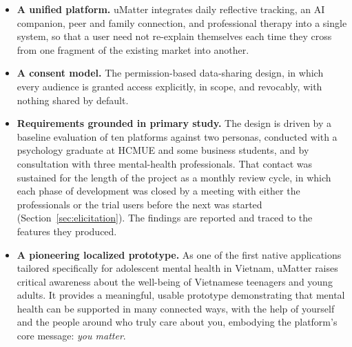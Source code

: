 \begin{itemize}
  \item \textbf{A unified platform.} uMatter integrates daily reflective
    tracking, an AI companion, peer and family connection, and professional
    therapy into a single system, so that a user need not re-explain themselves
    each time they cross from one fragment of the existing market into another.

  \item \textbf{A consent model.} The permission-based data-sharing design, in which every
    audience is granted access explicitly, in scope, and revocably, with nothing
    shared by default.


  \item \textbf{Requirements grounded in primary study.} The design is
    driven by a baseline evaluation of ten platforms against two
    personas, conducted with a psychology graduate at HCMUE and some business students, and by consultation
    with three mental-health professionals. That contact was sustained for the
    length of the project as a monthly review cycle, in which each phase of
    development was closed by a meeting with either the professionals or the
    trial users before the next was started
    (Section~\ref{sec:elicitation}). The findings are reported and traced to the features they produced.

    \item \textbf{A pioneering localized prototype.} As one of the first native 
    applications tailored specifically for adolescent mental health in Vietnam, uMatter raises 
    critical awareness about the well-being of Vietnamese teenagers and young adults. It provides 
    a meaningful, usable prototype demonstrating that mental health can be supported in many connected ways, with the help of yourself and the people around who truly care about you, embodying the platform's core message: \textit{you matter}.

\end{itemize}

